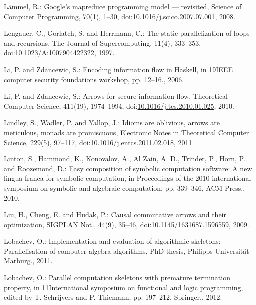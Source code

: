 \documentclass[paper=A4,twoside=true,openright,parskip=full,chapterprefix=true,headings=normal,bibliography=totoc,listof=totoc,titlepage=on,captions=tableabove,draft=false,british]{scrreprt}%
\begin{document}
\leavevmode\hypertarget{ref-LAMMEL20081}{}%
Lämmel, R.: Google's mapreduce programming model --- revisited, Science
of Computer Programming, 70(1), 1--30,
doi:\href{https://doi.org/10.1016/j.scico.2007.07.001}{10.1016/j.scico.2007.07.001},
2008.

\leavevmode\hypertarget{ref-Lengauer1997}{}%
Lengauer, C., Gorlatch, S. and Herrmann, C.: The static parallelization
of loops and recursions, The Journal of Supercomputing, 11(4), 333--353,\linebreak
doi:\href{https://doi.org/10.1023/A:1007904422322}{10.1023/A:1007904422322},
1997.

\leavevmode\hypertarget{ref-1648705}{}%
Li, P. and Zdancewic, S.: Encoding information flow in Haskell, in
19IEEE computer security foundations workshop, pp. 12--16., 2006.

\leavevmode\hypertarget{ref-LI20101974}{}%
Li, P. and Zdancewic, S.: Arrows for secure information flow,
Theoretical Computer Science, 411(19), 1974--1994,
doi:\href{https://doi.org/10.1016/j.tcs.2010.01.025}{10.1016/j.tcs.2010.01.025},
2010.

\leavevmode\hypertarget{ref-LINDLEY201197}{}%
Lindley, S., Wadler, P. and Yallop, J.: Idioms are oblivious, arrows are
meticulous, monads are promiscuous, Electronic Notes in Theoretical
Computer Science, 229(5), 97--117,
doi:\href{https://doi.org/10.1016/j.entcs.2011.02.018}{10.1016/j.entcs.2011.02.018},
2011.

\leavevmode\hypertarget{ref-scscp}{}%
Linton, S., Hammond, K., Konovalov, A., Al Zain, A. D., Trinder, P.,
Horn, P. and Roozemond, D.: Easy composition of symbolic computation
software: A new lingua franca for symbolic computation, in Proceedings
of the 2010 international symposium on symbolic and algebraic
computation, pp. 339--346, ACM Press., 2010.

\leavevmode\hypertarget{ref-Liu:2009:CCA:1631687.1596559}{}%
Liu, H., Cheng, E. and Hudak, P.: Causal commutative arrows and their
optimization, SIGPLAN Not., 44(9), 35--46,\linebreak
doi:\href{https://doi.org/10.1145/1631687.1596559}{10.1145/1631687.1596559},
2009.

\leavevmode\hypertarget{ref-lobachev-phd}{}%
Lobachev, O.: Implementation and evaluation of algorithmic skeletons:
Parallelisation of computer algebra algorithms, PhD thesis,
Philipps-Universität Marburg., 2011.

\leavevmode\hypertarget{ref-Lobachev2012}{}%
Lobachev, O.: Parallel computation skeletons with premature termination
property, in 11International symposium on functional and logic
programming, edited by T. Schrijvers and P. Thiemann, pp. 197--212,
Springer., 2012.
\end{document}
